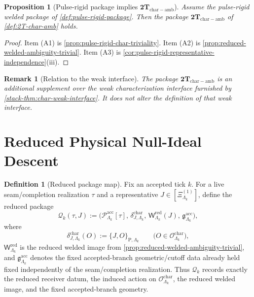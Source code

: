 \documentclass[11pt]{article}
\newtheorem{proposition}[theorem]{Proposition}
\newtheorem{remark}[theorem]{Remark}
\theoremstyle{definition}
\newtheorem{definition}[theorem]{Definition}
\begin{document}
\begin{proposition}[Pulse-rigid package implies \(\mathbf{2T}_{\mathrm{char\!-\!amb}}\)]
\label{prop:char-ambiguity-supplement-export}
Assume the pulse-rigid welded package of \cref{def:pulse-rigid-package}.
Then the package \(\mathbf{2T}_{\mathrm{char\!-\!amb}}\) of \cref{def:2T-char-amb} holds.
\end{proposition}

\begin{proof}
Item (A1) is \cref{prop:pulse-rigid-char-triviality}.
Item (A2) is \cref{prop:reduced-welded-ambiguity-trivial}.
Item (A3) is \cref{cor:pulse-rigid-representative-independence}(iii).
\end{proof}

\begin{remark}[Relation to the weak interface]
\label{rem:char-ambiguity-supplement-separate}
The package \(\mathbf{2T}_{\mathrm{char\!-\!amb}}\) is an additional supplement over the weak
characterization interface furnished by \cref{stack-thm:char-weak-interface}.
It does not alter the definition of that weak interface.
\end{remark}

\section{Reduced Physical Null-Ideal Descent}

\begin{definition}[Reduced package map]
\label{def:reduced-physical-package}
Fix an accepted tick \(k\).
For a live seam/completion realization \(\tau\) and a representative
\(
J\in[\Xi^{(1)}_{\Lambda_k}]
\),
define the reduced package
\[
\mathcal Q_k(\tau,J)
:=
\Big(
\mathcal P^{\mathrm{acc}}_{\Lambda_k}[\tau],\,
\delta^{\mathrm{char}}_{J,\Lambda_k},\,
\mathsf W^{\mathrm{red}}_{\Lambda_k}(J),\,
\mathfrak g^{\mathrm{acc}}_{\Lambda_k}
\Big),
\]
where
\[
\delta^{\mathrm{char}}_{J,\Lambda_k}(O)
:=
\{J,O\}_{\mathrm P,\Lambda_k}
\qquad
\big(O\in\mathcal O^{\mathrm{char}}_{\Lambda_k}\big),
\]
\(\mathsf W^{\mathrm{red}}_{\Lambda_k}\) is the reduced welded image from
\cref{prop:reduced-welded-ambiguity-trivial},
and \(\mathfrak g^{\mathrm{acc}}_{\Lambda_k}\) denotes the fixed accepted-branch geometric/cutoff
data already held fixed independently of the seam/completion realization.
Thus \(\mathcal Q_k\) records exactly the reduced receiver datum, the induced action on
\(\mathcal O^{\mathrm{char}}_{\Lambda_k}\), the reduced welded image, and the fixed accepted-branch
geometry.
\end{definition}
\end{document}
